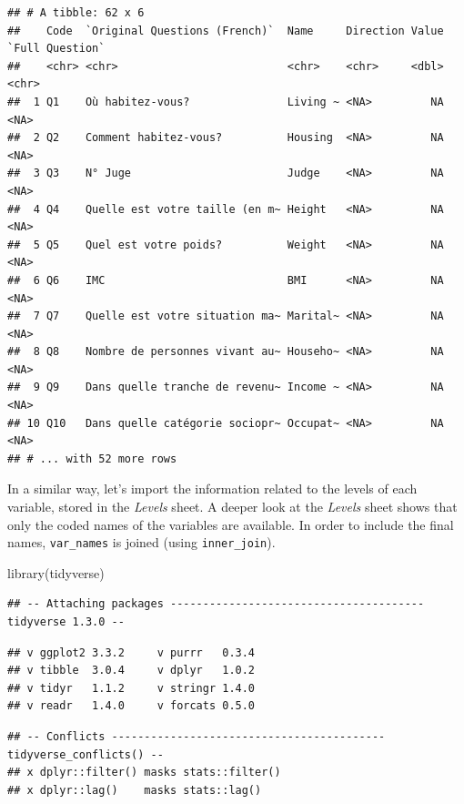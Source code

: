\documentclass[
]{book}
\newenvironment{Shaded}{\begin{snugshade}}{\end{snugshade}}
\newcommand{\FunctionTok}[1]{\textcolor[rgb]{0.00,0.00,0.00}{#1}}
\newcommand{\NormalTok}[1]{#1}
\begin{document}
\begin{verbatim}
## # A tibble: 62 x 6
##    Code  `Original Questions (French)`  Name     Direction Value `Full Question`
##    <chr> <chr>                          <chr>    <chr>     <dbl> <chr>          
##  1 Q1    Où habitez-vous?               Living ~ <NA>         NA <NA>           
##  2 Q2    Comment habitez-vous?          Housing  <NA>         NA <NA>           
##  3 Q3    N° Juge                        Judge    <NA>         NA <NA>           
##  4 Q4    Quelle est votre taille (en m~ Height   <NA>         NA <NA>           
##  5 Q5    Quel est votre poids?          Weight   <NA>         NA <NA>           
##  6 Q6    IMC                            BMI      <NA>         NA <NA>           
##  7 Q7    Quelle est votre situation ma~ Marital~ <NA>         NA <NA>           
##  8 Q8    Nombre de personnes vivant au~ Househo~ <NA>         NA <NA>           
##  9 Q9    Dans quelle tranche de revenu~ Income ~ <NA>         NA <NA>           
## 10 Q10   Dans quelle catégorie sociopr~ Occupat~ <NA>         NA <NA>           
## # ... with 52 more rows
\end{verbatim}

In a similar way, let's import the information related to the levels of each variable, stored in the \emph{Levels} sheet.
A deeper look at the \emph{Levels} sheet shows that only the coded names of the variables are available. In order to include the final names, \texttt{var\_names} is joined (using \texttt{inner\_join}).

\begin{Shaded}
\begin{Highlighting}[]
\FunctionTok{library}\NormalTok{(tidyverse)}
\end{Highlighting}
\end{Shaded}

\begin{verbatim}
## -- Attaching packages --------------------------------------- tidyverse 1.3.0 --
\end{verbatim}

\begin{verbatim}
## v ggplot2 3.3.2     v purrr   0.3.4
## v tibble  3.0.4     v dplyr   1.0.2
## v tidyr   1.1.2     v stringr 1.4.0
## v readr   1.4.0     v forcats 0.5.0
\end{verbatim}

\begin{verbatim}
## -- Conflicts ------------------------------------------ tidyverse_conflicts() --
## x dplyr::filter() masks stats::filter()
## x dplyr::lag()    masks stats::lag()
\end{verbatim}
\end{document}
